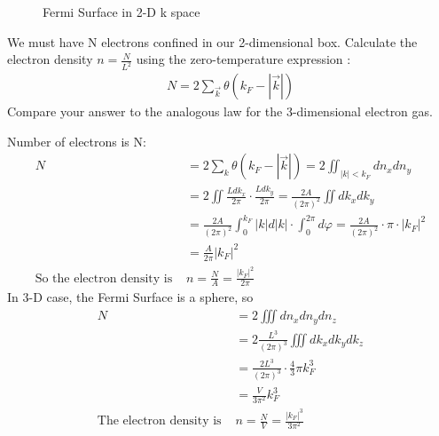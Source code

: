 \documentclass[answers]{exam}
\begin{document}
\begin{questions}
\begin{figure}[htbp]
\caption{Fermi Surface in 2-D k space}
\end{figure}
\question We must have N electrons confined in our 2-dimensional box. Calculate the electron density $n = \frac{N}{L^{2}}$ using the zero-temperature expression :
\begin{align*}
N=2 \sum_{\vec{k}} \theta\left(k_{F}-|\vec{k}|\right)
\end{align*}
Compare your answer to the analogous law for the 3-dimensional electron gas.
\begin{solution}
Number of electrons is N:
\begin{align*}
N &=2 \sum_{k} \theta\left(k_{F}-|\vec{k}|\right)=2 \iint_{|k|<k_{F}} d n_{x}  d n_{y} \\
&=2 \iint \frac{L d k_{x}}{2 \pi} \cdot \frac{L d k_{ y}}{2 \pi}=\frac{2 A}{(2 \pi)^{2}} \iint d k _{x} d k_{y}  \\
&=\frac{2 A}{(2 \pi)^{2}} \int_{0}^{k_{F}} |k|d|k|\cdot \int_{0}^{2\pi} d\varphi=\frac{2 A}{(2 \pi)^{2}} \cdot \pi\cdot \left|k_{F}\right|^{2} \\
&=\frac{A}{2 \pi}|k_{F}|^{2}\\
\text{So the electron density is }& n =\frac{N}{A}=\frac{|k_{F}|^2}{2\pi}
\end{align*}
In 3-D case, the Fermi Surface is a sphere, so 
\begin{align*}
N&=2 \iiint d n_{x} d n_{y} dn_{z} \\
&=2  \frac{L^{3}}{(2 \pi)^{3}} \iiint d k_{x} d k_{y} d k_{z} \\
&=\frac{2  L^{3}}{(2 \pi)^{3}} \cdot \frac{4}{3} \pi k_{F}^{3} \\
&=\frac{V}{3 \pi^{2}} k_{F}^{3}\\
\text{The electron density is }& n =\frac{N}{V}=\frac{|k_{F}|^3}{3{\pi}^2}
\end{align*}
\end{solution}


\end{questions}
\end{document}
